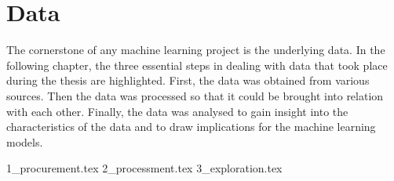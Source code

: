 \section{Data}

The cornerstone of any machine learning project is the underlying data. In the following chapter, the three essential steps in dealing with data that took place during the thesis are highlighted. First, the data was obtained from various sources. Then the data was processed so that it could be brought into relation with each other. Finally, the data was analysed to gain insight into the characteristics of the data and to draw implications for the machine learning models.

{1_procurement.tex}
{2_processment.tex}
{3_exploration.tex}
